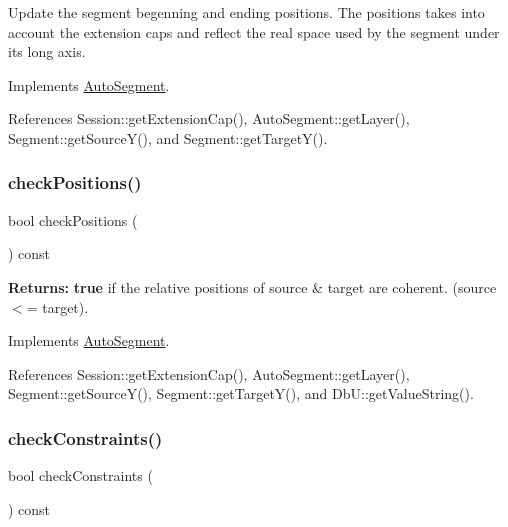 Update the segment begenning and ending positions. The positions takes into account the extension caps and reflect the real space used by the segment under it\textquotesingle{}s long axis. 

Implements \mbox{\hyperlink{classKatabatic_1_1AutoSegment_a6d95f4de39c13611786c95ddc7b8942e}{Auto\+Segment}}.



References Session\+::get\+Extension\+Cap(), Auto\+Segment\+::get\+Layer(), Segment\+::get\+Source\+Y(), and Segment\+::get\+Target\+Y().

\mbox{\label{classKatabatic_1_1AutoVertical_a6575c17bfa589c087215c87678e5719c}} 
\subsubsection{\texorpdfstring{check\+Positions()}{checkPositions()}}
{\footnotesize\ttfamily bool check\+Positions (\begin{DoxyParamCaption}{ }\end{DoxyParamCaption}) const\hspace{0.3cm}{\ttfamily [virtual]}}

{\bfseries Returns\+:} {\bfseries true} if the relative positions of source \& target are coherent. (source $<$= target). 

Implements \mbox{\hyperlink{classKatabatic_1_1AutoSegment_af026a81002bd907f1ccd4a4784aaa1db}{Auto\+Segment}}.



References Session\+::get\+Extension\+Cap(), Auto\+Segment\+::get\+Layer(), Segment\+::get\+Source\+Y(), Segment\+::get\+Target\+Y(), and Db\+U\+::get\+Value\+String().

\mbox{\label{classKatabatic_1_1AutoVertical_a8aef8f4bbafe3426840f9ebf31bb3b81}} 
\subsubsection{\texorpdfstring{check\+Constraints()}{checkConstraints()}}
{\footnotesize\ttfamily bool check\+Constraints (\begin{DoxyParamCaption}{ }\end{DoxyParamCaption}) const\hspace{0.3cm}{\ttfamily [virtual]}}

